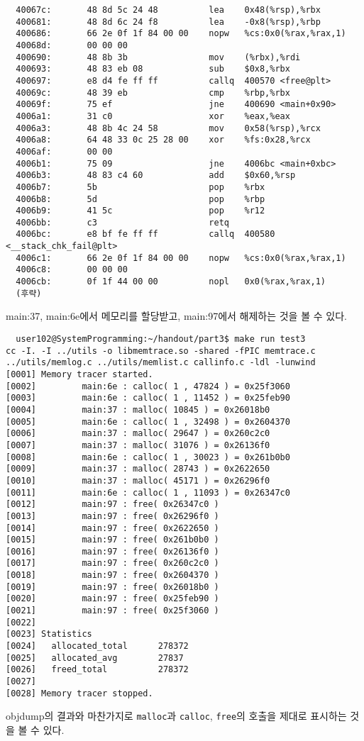 \documentclass{report}
\begin{document}
\begin{verbatim}
  40067c:       48 8d 5c 24 48          lea    0x48(%rsp),%rbx
  400681:       48 8d 6c 24 f8          lea    -0x8(%rsp),%rbp
  400686:       66 2e 0f 1f 84 00 00    nopw   %cs:0x0(%rax,%rax,1)
  40068d:       00 00 00
  400690:       48 8b 3b                mov    (%rbx),%rdi
  400693:       48 83 eb 08             sub    $0x8,%rbx
  400697:       e8 d4 fe ff ff          callq  400570 <free@plt>
  40069c:       48 39 eb                cmp    %rbp,%rbx
  40069f:       75 ef                   jne    400690 <main+0x90>
  4006a1:       31 c0                   xor    %eax,%eax
  4006a3:       48 8b 4c 24 58          mov    0x58(%rsp),%rcx
  4006a8:       64 48 33 0c 25 28 00    xor    %fs:0x28,%rcx
  4006af:       00 00
  4006b1:       75 09                   jne    4006bc <main+0xbc>
  4006b3:       48 83 c4 60             add    $0x60,%rsp
  4006b7:       5b                      pop    %rbx
  4006b8:       5d                      pop    %rbp
  4006b9:       41 5c                   pop    %r12
  4006bb:       c3                      retq
  4006bc:       e8 bf fe ff ff          callq  400580 <__stack_chk_fail@plt>
  4006c1:       66 2e 0f 1f 84 00 00    nopw   %cs:0x0(%rax,%rax,1)
  4006c8:       00 00 00
  4006cb:       0f 1f 44 00 00          nopl   0x0(%rax,%rax,1)
  (후략)
\end{verbatim}
main:37, main:6e에서 메모리를 할당받고, main:97에서 해제하는 것을 볼 수 있다.
\begin{verbatim}
  user102@SystemProgramming:~/handout/part3$ make run test3
cc -I. -I ../utils -o libmemtrace.so -shared -fPIC memtrace.c ../utils/memlog.c ../utils/memlist.c callinfo.c -ldl -lunwind
[0001] Memory tracer started.
[0002]         main:6e : calloc( 1 , 47824 ) = 0x25f3060
[0003]         main:6e : calloc( 1 , 11452 ) = 0x25feb90
[0004]         main:37 : malloc( 10845 ) = 0x26018b0
[0005]         main:6e : calloc( 1 , 32498 ) = 0x2604370
[0006]         main:37 : malloc( 29647 ) = 0x260c2c0
[0007]         main:37 : malloc( 31076 ) = 0x26136f0
[0008]         main:6e : calloc( 1 , 30023 ) = 0x261b0b0
[0009]         main:37 : malloc( 28743 ) = 0x2622650
[0010]         main:37 : malloc( 45171 ) = 0x26296f0
[0011]         main:6e : calloc( 1 , 11093 ) = 0x26347c0
[0012]         main:97 : free( 0x26347c0 )
[0013]         main:97 : free( 0x26296f0 )
[0014]         main:97 : free( 0x2622650 )
[0015]         main:97 : free( 0x261b0b0 )
[0016]         main:97 : free( 0x26136f0 )
[0017]         main:97 : free( 0x260c2c0 )
[0018]         main:97 : free( 0x2604370 )
[0019]         main:97 : free( 0x26018b0 )
[0020]         main:97 : free( 0x25feb90 )
[0021]         main:97 : free( 0x25f3060 )
[0022]
[0023] Statistics
[0024]   allocated_total      278372
[0025]   allocated_avg        27837
[0026]   freed_total          278372
[0027]
[0028] Memory tracer stopped.
\end{verbatim}
objdump의 결과와 마찬가지로 \lstinline{malloc}과 \lstinline{calloc}, \lstinline{free}의 호출을 제대로 표시하는 것을 볼 수 있다.
\end{document}
